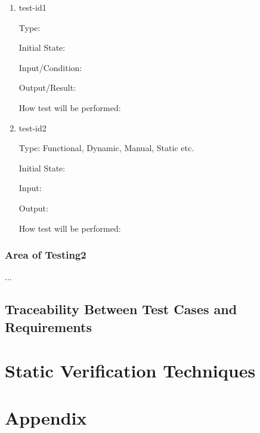 \documentclass[12pt, titlepage]{article}
\begin{document}
\begin{enumerate}

\item{test-id1\\}

Type: 
					
Initial State: 
					
Input/Condition: 
					
Output/Result: 
					
How test will be performed: 
					
\item{test-id2\\}

Type: Functional, Dynamic, Manual, Static etc.
					
Initial State: 
					
Input: 
					
Output: 
					
How test will be performed: 

\end{enumerate}

\subsubsection{Area of Testing2}

...

\subsection{Traceability Between Test Cases and Requirements}


\section{Static Verification Techniques}

				




\newpage

\section{Appendix}
\end{document}
